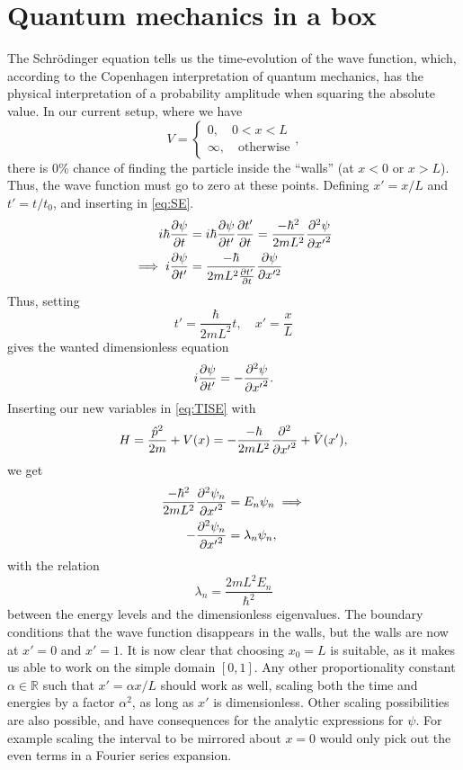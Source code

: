 \section{Quantum mechanics in a box}

The Schrödinger equation tells us the time-evolution of the wave function, which, according to the Copenhagen interpretation of quantum mechanics, has the physical interpretation of a probability amplitude when squaring the absolute value. In our current setup, where we have
\begin{equation} 
V = \begin{cases}
0,\quad 0<x<L \\
\infty,\quad \text{otherwise}
\end{cases},
\end{equation}
there is 0\% chance of finding the particle inside the ``walls'' (at $x<0$ or $x> L$). Thus, the wave function must go to zero at these points. Defining $x' = x/L$ and $t'=t/t_0$, and inserting in \cref{eq:SE}.
\begin{align*} 
i\hbar\pdv{\psi}{t} &= i\hbar\pdv{\psi}{t'}\pdv{t'}{t}= \frac{-\hbar^2}{2mL^2}\pdv[2]{\psi}{{x'}}\\
\implies i\pdv{\psi}{t'} &= \frac{-\hbar}{2mL^2 \pdv{t'}{t}}\pdv{\psi}{x'^2}
\end{align*}
Thus, setting
\begin{equation}
\label{eq:normalized_stuff}
t' = \frac{\hbar}{2mL^2}t,\quad x' = \frac{x}{L}
\end{equation}
gives the wanted dimensionless equation
\begin{equation}
\label{eq:SE_dimensionless}
i\pdv{\psi}{t'} = -\pdv[2]{\psi}{{x'}}.
\end{equation}
Inserting our new variables in \cref{eq:TISE} with \[H = \frac{\hat p^2}{2m} + V(x) =  -\frac{-\hbar}{2mL^2} \pdv[2]{{x'}} + \tilde{V}(x'),\] we get
\begin{align} 
\frac{-\hbar^2}{2mL^2}\pdv[2]{\psi_n}{{x'}} &= E_n\psi_n \implies \nonumber\\
\label{eq:eig}
-\pdv[2]{\psi_n}{{x'}} &= \lambda_n\psi_n,
\end{align}
with the relation 
\begin{equation} 
\lambda_n = \frac{2mL^2 E_n}{\hbar^2}
\end{equation}
between the energy levels and the dimensionless eigenvalues. The boundary conditions that the wave function disappears in the walls, but the walls are now at $x' = 0$ and $x' = 1$. It is now clear that choosing $x_0 = L$ is suitable, as it makes us able to work on the simple domain $[0,1]$. Any other proportionality constant $\alpha\in \mathbb{R}$ such that $x' = \alpha x/ L$ should work as well, scaling both the time and energies by a factor $\alpha^2 $, as long as $x'$ is dimensionless. Other scaling possibilities are also possible, and have consequences for the analytic expressions for $\psi$. For example scaling the interval to be mirrored about $x = 0$ would only pick out the even terms in a Fourier series expansion.

